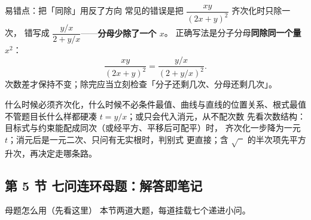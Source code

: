 \begin{commonerror}{易错点：把「同除」用反了方向}
常见的错误是把 $\dfrac{xy}{(2x+y)^2}$ 齐次化时只除一次，
错写成 $\dfrac{y/x}{2+y/x}$——\textbf{分母少除了一个 $x$}。
正确写法是分子分母\textbf{同除同一个量} $x^2$：
\[
  \dfrac{xy}{(2x+y)^2}=\dfrac{y/x}{(2+y/x)^2}.
\]
次数差才保持不变；除完应当立刻检查「分子还剩几次、分母还剩几次」。
\end{commonerror}

\begin{conccard}[二级]{什么时候必须齐次化，什么时候不必}{条件最值、曲线与直线的位置关系、根式最值}{不管题目长什么样都硬凑 $t=y/x$；或只会代入消元，从不配次数}
先看次数结构：目标式与约束能配成同次（或经平方、平移后可配平）时，
齐次化一步降为一元 $t$；消元后是一元二次、只问有无实根时，判别式
更直接；含 $\sqrt{\phantom{x}}$ 的半次项先平方升次，再决定走哪条路。
\end{conccard}


\subsection{第 5 节 七问连环母题：解答即笔记}

\begin{warmupbox}{母题怎么用（先看这里）}
本节两道大题，每道挂载七个递进小问。
\end{warmupbox}

